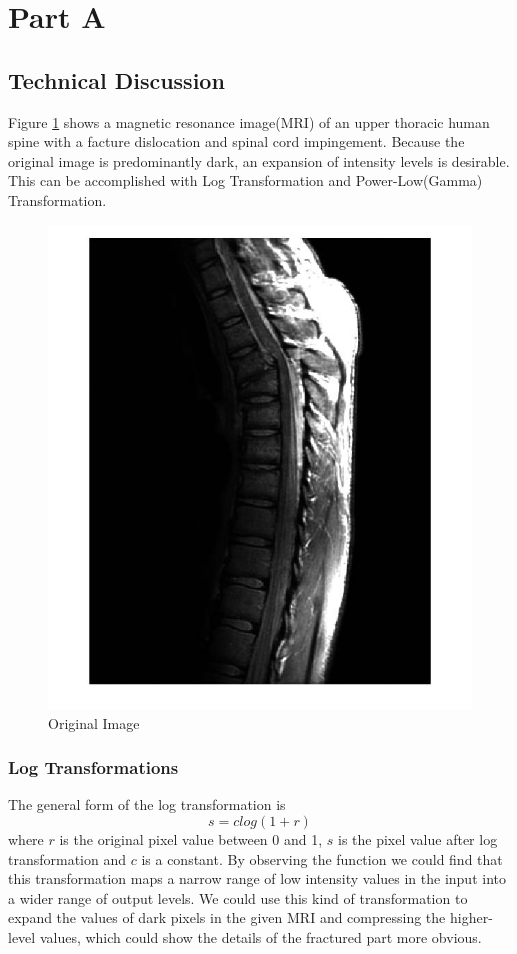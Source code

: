 \section{Part A}
\subsection{Technical Discussion}
Figure \ref{fig:original} shows a magnetic resonance image(MRI) of an upper thoracic human spine with a facture dislocation and spinal cord impingement. Because the original image is predominantly dark, an expansion of intensity levels is desirable. This can be accomplished with Log Transformation and Power-Low(Gamma) Transformation.
\begin{figure}[h]
\centering
\includegraphics[scale=0.2]{0308}
\caption{Original Image}
\label{fig:original}
\end{figure}
\subsubsection{Log Transformations}
The general form of the log transformation is
$$ s=clog(1 + r) $$
where $r$ is the original pixel value between 0 and 1, $s$ is the pixel value after log transformation and $c$ is a constant. By observing the function we could find that this transformation maps a narrow range of low intensity values in the input into a wider range of output levels. We could use this kind of transformation to expand the values of dark pixels in the given MRI and compressing the higher-level values, which could show the details of the fractured part more obvious. 
